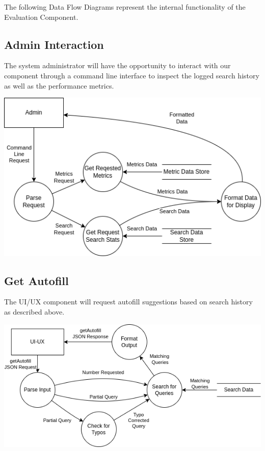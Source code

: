 The following Data Flow Diagrams represent the internal functionality of the Evaluation Component.

\subsection*{Admin Interaction}

The system administrator will have the opportunity to interact with our component through a command line interface to inspect the logged search history as well as the performance metrics.

\begin{center}
  \includegraphics[scale=0.7]{DFDs/LowLevelDFDs-AdminView.drawio.png}
\end{center}

\subsection*{Get Autofill}

The UI/UX component will request autofill suggestions based on search history as described above.

\begin{center}
  \includegraphics[scale=0.7]{DFDs/LowLevelDFDs-GetAutofill.drawio.png}
\end{center}

